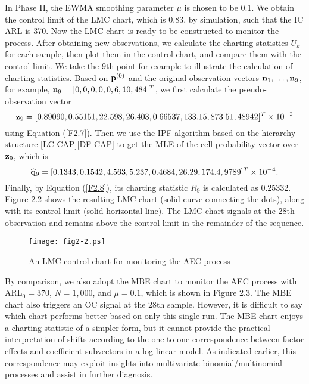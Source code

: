In Phase II, the EWMA smoothing parameter $\mu$ is chosen to be 0.1. We obtain the
control limit of the LMC chart, which is 0.83, by simulation, such that the IC ARL
is 370. Now the LMC chart is ready to be constructed to monitor the process. After
obtaining new observations, we calculate the charting statistics $U_k$ for each
sample, then plot them in the control chart, and compare them with the control
limit. We take the 9th point for example to illustrate the calculation of charting
statistics. Based on ${\bf p}^{(0)}$ and the original observation vectors ${\bf
n}_1,\ldots,{\bf n}_9$, for example, ${\bf n}_9=[0, 0, 0, 0, 0, 6, 10, 484]^T$, we
first calculate the pseudo-observation vector
\[
{\bf z}_9=[0.89090, 0.55151, 22.598, 26.403, 0.66537, 133.15, 873.51, 48942]^T\times
10^{-2}
\]
using Equation (\ref{F2.7}). Then we use the IPF algorithm based on the hierarchy
structure [LC CAP][DF CAP] to get the MLE of the cell probability vector over ${\bf
z}_9$, which is
\[
\widehat{\bf q}_9=[0.1343, 0.1542, 4.563, 5.237, 0.4684, 26.29, 174.4, 9789]^T\times
10^{-4}.
\]
Finally, by Equation (\ref{F2.8}), its charting statistic $R_9$ is calculated as
0.25332. Figure 2.2 shows the resulting LMC chart (solid curve connecting the dots),
along with its control limit (solid horizontal line). The LMC chart signals at the
28th observation and remains above the control limit in the remainder of the
sequence.

\begin{figure}[ht]
\begin{center}
\texttt{[image: fig2-2.ps]}
\vspace{-0.7cm} \caption{An LMC control chart for monitoring the AEC
process}\vspace{-0.3cm}
\end{center}
\end{figure}

By comparison, we also adopt the MBE chart to monitor the AEC process with
ARL$_0=370$, $N=1,000$, and $\mu=0.1$, which is shown in Figure 2.3. The MBE chart
also triggers an OC signal at the 28th sample. However, it is difficult to say which
chart performs better based on only this single run. The MBE chart enjoys a charting
statistic of a simpler form, but it cannot provide the practical interpretation of
shifts according to the one-to-one correspondence between factor effects and
coefficient subvectors in a log-linear model. As indicated earlier, this
correspondence may exploit insights into multivariate binomial/multinomial processes
and assist in further diagnosis.

